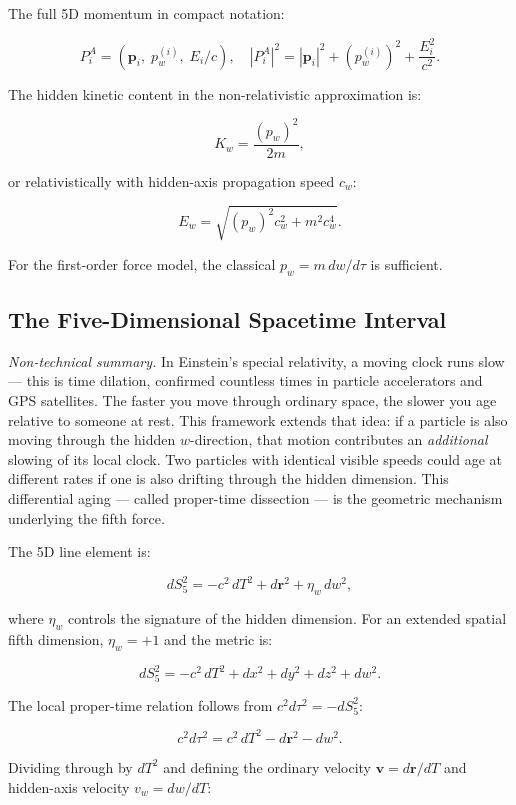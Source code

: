 \documentclass[11pt,a4paper]{article}
\newcommand{\pw}{p_w}                        %
\newcommand{\PA}{P^A}                        %
\newcommand{\dS}{dS_5^2}                     %
\newcommand{\Kw}{K_w}                        %
\begin{document}
\medskip
The full 5D momentum in compact notation:

\[
  \PA_i = (\mathbf{p}_i,\;\pw^{(i)},\;E_i/c) ,
  \quad
  |\PA_i|^2 = |\mathbf{p}_i|^2 + (\pw^{(i)})^2 + \frac{E_i^2}{c^2} .
\]

The hidden kinetic content in the non-relativistic approximation is:

\[
  \Kw = \frac{(\pw)^2}{2m} ,
\]

or relativistically with hidden-axis propagation speed $c_w$:

\[
  E_w = \sqrt{(\pw)^2 c_w^2 + m^2 c_w^4} .
\]

For the first-order force model, the classical $\pw = m\,dw/d\tau$ is
sufficient.

\subsection{The Five-Dimensional Spacetime Interval}\label{sec:interval}

\textit{Non-technical summary.}\enspace
In Einstein's special relativity, a moving clock runs slow --- this is time
dilation, confirmed countless times in particle accelerators and GPS satellites.
The faster you move through ordinary space, the slower you age relative to
someone at rest.  This framework extends that idea: if a particle is also
moving through the hidden $w$-direction, that motion contributes an
\emph{additional} slowing of its local clock.  Two particles with identical
visible speeds could age at different rates if one is also drifting through
the hidden dimension.  This differential aging --- called proper-time
dissection --- is the geometric mechanism underlying the fifth force.

The 5D line element is:

\begin{keybox}
\[
  \dS = -c^2\,dT^2 + d\mathbf{r}^2 + \eta_w\,dw^2 ,
\]
\end{keybox}

\noindent
where $\eta_w$ controls the signature of the hidden dimension.  For an
extended spatial fifth dimension, $\eta_w = +1$ and the metric is:

\[
  \dS = -c^2\,dT^2 + dx^2 + dy^2 + dz^2 + dw^2 .
\]

The local proper-time relation follows from $c^2 d\tau^2 = -\dS$:

\[
  c^2 d\tau^2 = c^2\,dT^2 - d\mathbf{r}^2 - dw^2 .
\]

Dividing through by $dT^2$ and defining the ordinary velocity
$\mathbf{v} = d\mathbf{r}/dT$ and hidden-axis velocity
$v_w = dw/dT$:
\end{document}
